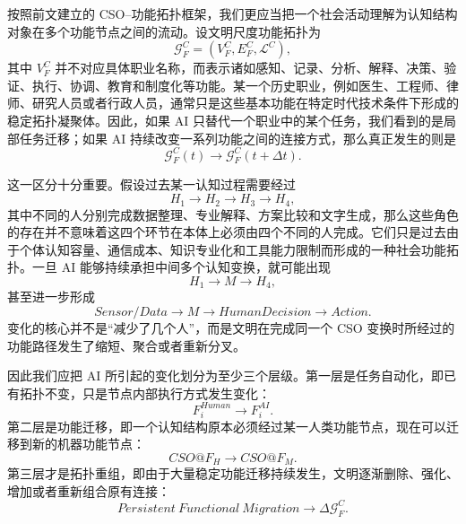 按照前文建立的 CSO--功能拓扑框架，我们更应当把一个社会活动理解为认知结构对象在多个功能节点之间的流动。设文明尺度功能拓扑为
\begin{equation}
\mathcal{G}^{C}_{F}
=
\left(
V^{C}_{F},
E^{C}_{F},
\mathcal{L}^{C}
\right),
\end{equation}
其中 $V^{C}_{F}$ 并不对应具体职业名称，而表示诸如感知、记录、分析、解释、决策、验证、执行、协调、教育和制度化等功能。某一个历史职业，例如医生、工程师、律师、研究人员或者行政人员，通常只是这些基本功能在特定时代技术条件下形成的稳定拓扑凝聚体。因此，如果 AI 只替代一个职业中的某个任务，我们看到的是局部任务迁移；如果 AI 持续改变一系列功能之间的连接方式，那么真正发生的则是
\begin{equation}
\mathcal{G}^{C}_{F}(t)
\longrightarrow
\mathcal{G}^{C}_{F}(t+\Delta t).
\end{equation}

这一区分十分重要。假设过去某一认知过程需要经过
\begin{equation}
H_1
\rightarrow
H_2
\rightarrow
H_3
\rightarrow
H_4,
\end{equation}
其中不同的人分别完成数据整理、专业解释、方案比较和文字生成，那么这些角色的存在并不意味着这四个环节在本体上必须由四个不同的人完成。它们只是过去由于个体认知容量、通信成本、知识专业化和工具能力限制而形成的一种社会功能拓扑。一旦 AI 能够持续承担中间多个认知变换，就可能出现
\begin{equation}
H_1
\rightarrow
M
\rightarrow
H_4,
\end{equation}
甚至进一步形成
\begin{equation}
Sensor/Data
\rightarrow
M
\rightarrow
HumanDecision
\rightarrow
Action.
\end{equation}
变化的核心并不是“减少了几个人”，而是文明在完成同一个 CSO 变换时所经过的功能路径发生了缩短、聚合或者重新分叉。

因此我们应把 AI 所引起的变化划分为至少三个层级。第一层是任务自动化，即已有拓扑不变，只是节点内部执行方式发生变化：
\begin{equation}
F_i^{Human}
\rightarrow
F_i^{AI}.
\end{equation}
第二层是功能迁移，即一个认知结构原本必须经过某一人类功能节点，现在可以迁移到新的机器功能节点：
\begin{equation}
CSO@F_H
\rightarrow
CSO@F_M.
\end{equation}
第三层才是拓扑重组，即由于大量稳定功能迁移持续发生，文明逐渐删除、强化、增加或者重新组合原有连接：
\begin{equation}
Persistent\ Functional\ Migration
\rightarrow
\Delta\mathcal{G}^{C}_{F}.
\end{equation}

